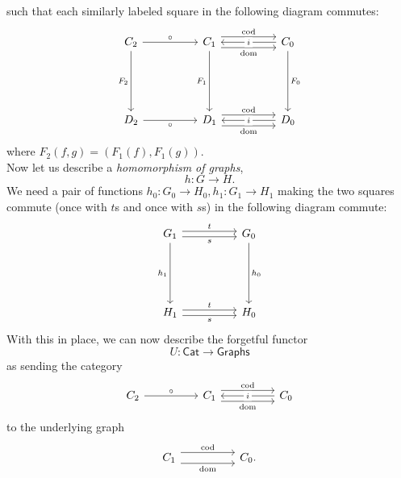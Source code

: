 such that each similarly labeled square in the following diagram commutes:
\begin{equation} \label{diag:func}
	\begin{tikzcd}
C_2 \arrow[rr, "\circ"] \arrow[ddd, "F_2"'] &  & C_1 \arrow[rr, "\cod", shift left=2] \arrow[rr, "\dom"', shift right=2] \arrow[ddd, "F_1"'] &  & C_0 \arrow[ll, "i" description] \arrow[ddd, "F_0"] \\ &&&&\\ &&&&\\
D_2 \arrow[rr, "\circ"']&  & D_1 \arrow[rr, "\cod", shift left=2] \arrow[rr, "\dom"', shift right=2]&  & D_0 \arrow[ll, "i" description]                  
\end{tikzcd}
\end{equation}
where $F_2(f, g) = (F_1(f), F_1(g)).$\\
Now let us describe a \emph{homomorphism of graphs},
\begin{equation*} 
	h:G \to H.
\end{equation*}
We need a pair of functions $h_0 : G_0 \to H_0, h_1 : G_1 \to H_1$ making the two squares commute (once with $t$s and once with $s$s) in the following diagram commute:
\begin{equation} \label{diag:graphhomo}
	\begin{tikzcd}
		G_1 \arrow[rr, "t", shift left = 1] \arrow[rr, "s"', shift right = 1] \arrow[ddd, "h_1"'] && G_0 \arrow[ddd, "h_0"]\\
		&&\\
		&&\\
		H_1 \arrow[rr, "t", shift left = 1] \arrow[rr, "s"', shift right = 1] && H_0
	\end{tikzcd}
\end{equation}
With this in place, we can now describe the forgetful functor
\begin{equation*} 
	U:\mathsf{Cat} \to \mathsf{Graphs}
\end{equation*}
as sending the category
\begin{equation*} 
	\begin{tikzcd}
	C_2 \arrow[rr, "\circ"] &  & C_1 \arrow[rr, "\cod", shift left=2] \arrow[rr, "\dom"', shift right=2] &  & C_0 \arrow[ll, "i" description]
	\end{tikzcd}
\end{equation*}
to the underlying graph
\begin{equation*} 
	\begin{tikzcd}
	C_1 \arrow[rr, "\cod", shift left=2] \arrow[rr, "\dom"', shift right=2] &  & C_0.
	\end{tikzcd}
\end{equation*}
